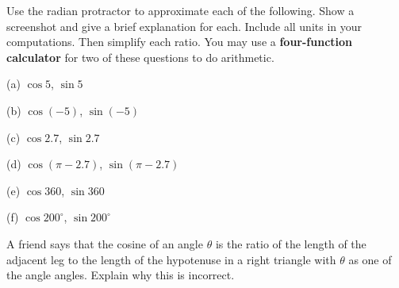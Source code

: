 \documentclass{ximera}
\begin{document}
\begin{exploration}\label{Exp1:CF}
Use the radian protractor to approximate each of the following. Show a screenshot and give a brief explanation for each. Include all units in your computations. Then simplify each ratio. You may use a {\bf four-function calculator} for two of these questions to do arithmetic.

(a) $\cos 5$, $\sin 5$

(b) $\cos (-5)$,  $\sin (-5)$

(c) $\cos 2.7$, $\sin 2.7$

(d) $\cos (\pi - 2.7)$, $\sin (\pi-2.7)$

(e) $\cos 360$, $\sin 360$

(f) $\cos 200^\circ$, $\sin 200^\circ$

 
\begin{onlineOnly}
    \begin{center}
\end{center}
\end{onlineOnly}
\end{exploration}

\begin{question} \label{Q2:Cosine}
A friend says that the cosine of an angle $\theta$ is the ratio of the length of the adjacent leg to the length of the hypotenuse in a right triangle with $\theta$ as one of the angle angles. Explain why this is incorrect.
\end{question}
\end{document}
